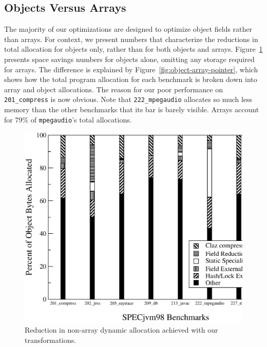 \documentclass{acmconf}
\begin{document}
\subsection{Objects Versus Arrays}

The majority of our optimizations are designed to optimize
object fields rather than arrays. For context, we present numbers 
that characterize the reductions in total allocation for objects only,
rather than for both objects and arrays. Figure~\ref{fig:non-array}
presents space savings numbers for objects alone, omitting
any storage required for arrays.  The difference is explained by
Figure~\ref{fig:object-array-pointer}, which shows how the total
program allocation for each benchmark is broken down into array and
object allocations.  The reason for our poor performance on {\tt
  201\_compress} is now obvious.  Note that {\tt 222\_mpegaudio}
allocates so much less memory than the other benchmarks that its bar
is barely visible.  Arrays account for 79\% of {\tt mpegaudio}'s total
allocations.

\begin{figure}
\includegraphics[scale=0.32,clip=true]{Figures/oopsla-objalloc.eps}
\caption{Reduction in non-array dynamic allocation achieved with
  our transformations.}
\label{fig:non-array}
\end{figure}
\end{document}
